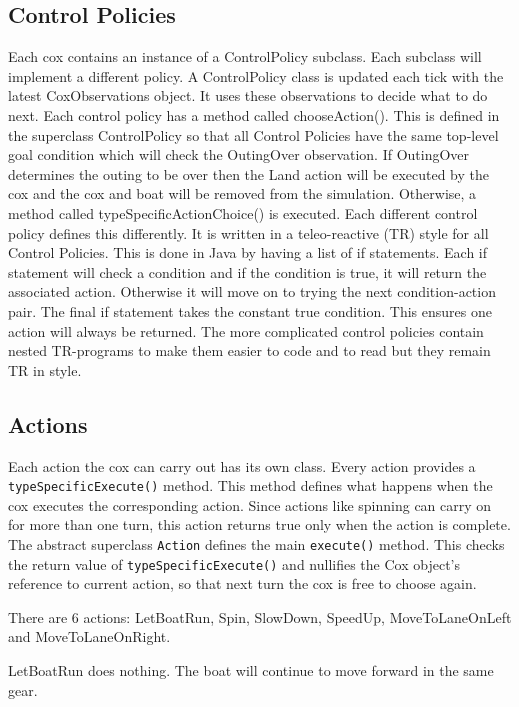 \subsection{Control Policies}
  Each cox contains an instance of a ControlPolicy subclass. Each subclass will implement a different policy. A ControlPolicy class is updated each tick with the latest CoxObservations object. It uses these observations to decide what to do next.  Each control policy has a method called chooseAction(). This is defined in the superclass ControlPolicy so that all Control Policies have the same top-level goal condition which will check the OutingOver observation. If OutingOver determines the outing to be over then the Land action will be executed by the cox and the cox and boat will be removed from the simulation. Otherwise, a method called typeSpecificActionChoice() is executed. Each different control policy defines this differently. It is written in a teleo-reactive (TR) style for all Control Policies. This is done in Java by having a list of if statements. Each if statement will check a condition and if the condition is true, it will return the associated action. Otherwise it will move on to trying the next condition-action pair. The final if statement takes the constant true condition. This ensures one action will always be returned. The more complicated control policies contain nested TR-programs to make them easier to code and to read but they remain TR in style.
  
\subsection{Actions}
  Each action the cox can carry out has its own class. Every action provides a \texttt{typeSpecificExecute()} method. This method defines what happens when the cox executes the corresponding action. Since actions like spinning can carry on for more than one turn, this action returns true only when the action is complete. The abstract superclass \texttt{Action} defines the main \texttt{execute()} method. This checks the return value of \texttt{typeSpecificExecute()} and nullifies the Cox object's reference to current action, so that next turn the cox is free to choose again.

  There are 6 actions: LetBoatRun, Spin, SlowDown, SpeedUp, MoveToLaneOnLeft and MoveToLaneOnRight.
  
  LetBoatRun does nothing. The boat will continue to move forward in the same gear.
  
